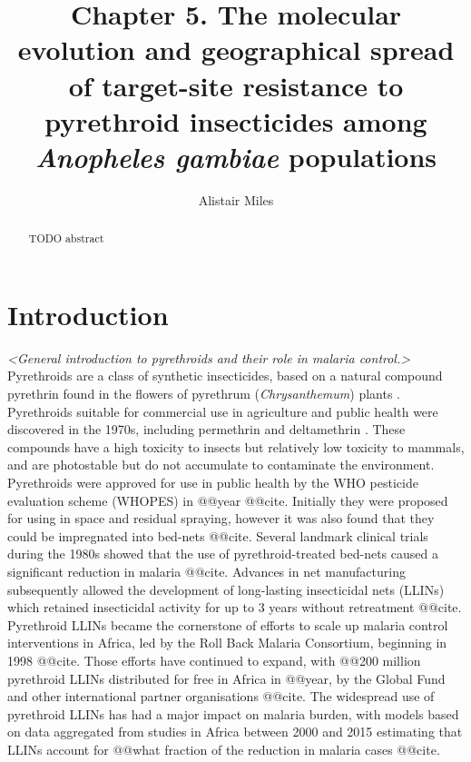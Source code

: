 \documentclass[a4paper,11pt,abstracton,hidelinks]{scrartcl}
\title{Chapter 5. The molecular evolution and geographical spread of target-site resistance to pyrethroid insecticides among \textit{Anopheles gambiae} populations}
\author[1,2]{\small Alistair Miles}
\affil[1]{\footnotesize Big Data Institute, University of Oxford, Li Ka Shing Centre for Health Information and Discovery, Old Road Campus, Oxford OX3 7LF}
\affil[2]{\footnotesize Wellcome Sanger Institute, Hinxton, Cambridge CB10 1SA}
\begin{document}
\maketitle


\begin{abstract}


TODO abstract


\end{abstract}


\section*{Introduction}


\textit{<General introduction to pyrethroids and their role in malaria control.>}
%
Pyrethroids are a class of synthetic insecticides, based on a natural compound pyrethrin found in the flowers of pyrethrum (\textit{Chrysanthemum}) plants \autocite{Elliott1989}.
%
Pyrethroids suitable for commercial use in agriculture and public health were discovered in the 1970s, including permethrin \autocite{Elliott1973} and deltamethrin \autocite{Elliott1974}.
%
These compounds have a high toxicity to insects but relatively low toxicity to mammals, and are photostable but do not accumulate to contaminate the environment.
%
Pyrethroids were approved for use in public health by the WHO pesticide evaluation scheme (WHOPES) in @@year @@cite.
%
Initially they were proposed for using in space and residual spraying, however it was also found that they could be impregnated into bed-nets @@cite.
%
Several landmark clinical trials during the 1980s showed that the use of pyrethroid-treated bed-nets caused a significant reduction in malaria @@cite.
%
Advances in net manufacturing subsequently allowed the development of long-lasting insecticidal nets (LLINs) which retained insecticidal activity for up to 3 years without retreatment @@cite.
%
Pyrethroid LLINs became the cornerstone of efforts to scale up malaria control interventions in Africa, led by the Roll Back Malaria Consortium, beginning in 1998 @@cite.
%
Those efforts have continued to expand, with @@200 million pyrethroid LLINs distributed for free in Africa in @@year, by the Global Fund and other international partner organisations @@cite.
%
The widespread use of pyrethroid LLINs has had a major impact on malaria burden, with models based on data aggregated from studies in Africa between 2000 and 2015 estimating that LLINs account for @@what fraction of the reduction in malaria cases @@cite.
\end{document}
